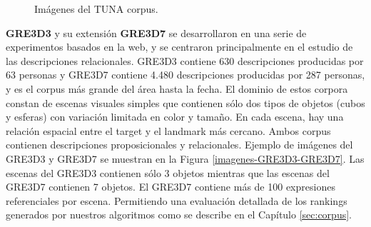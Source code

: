 \begin{figure}[!ht]
\begin{subfigure}{.5\textwidth}
\caption{}
\label{fig-TUNA-people}
\end{subfigure}
\caption{Im\'agenes del TUNA corpus.}\label{imagenes-tuna}
\end{figure}


\label{sec:corpusGRE}
{\bf GRE3D3} y su extensi\'on {\bf GRE3D7} \cite{gre3d3,gre3d7} se desarrollaron en una serie de experimentos basados en la web, y se centraron principalmente en el estudio de las descripciones relacionales. GRE3D3 contiene 630 descripciones producidas por 63 personas y GRE3D7 contiene 4.480 descripciones producidas por 287 personas, y es el corpus m\'as grande del \'area hasta la fecha. El dominio de estos corpora constan de escenas visuales simples que contienen s\'olo dos tipos de objetos (cubos y esferas) con variaci\'on limitada en color y tama\~no. En cada escena, hay una relaci\'on espacial entre el target y el landmark m\'as cercano. Ambos corpus contienen descripciones proposicionales y relacionales. Ejemplo de im\'agenes del GRE3D3 y GRE3D7 se muestran en la Figura \ref{imagenes-GRE3D3-GRE3D7}. Las escenas del GRE3D3 contienen s\'olo 3 objetos mientras que las escenas del GRE3D7 contienen 7 objetos. El GRE3D7 contiene m\'as de 100 expresiones referenciales por escena. Permitiendo una evaluaci\'on detallada de los rankings generados por nuestros algoritmos como se describe en el Cap\'itulo \ref{sec:corpus}.\\

